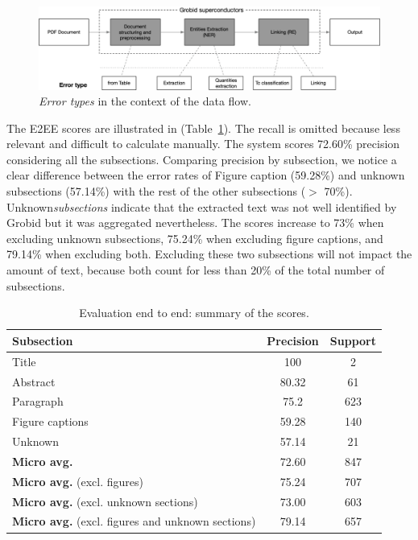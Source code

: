 \documentclass[]{interact}
\theoremstyle{plain}%
\theoremstyle{definition}
\theoremstyle{remark}
\begin{document}
\begin{figure}[ht]
\centering
\includegraphics[width=\textwidth]{error-types-3.png}
\caption{\textit{Error types} in the context of the data flow. }
\label{fig:error-types}
\end{figure}

The E2EE scores are illustrated in (Table~\ref{table:end2end-evaluation-summary}). 
The recall is omitted because less relevant and difficult to calculate manually. 
The system scores 72.60\% precision considering all the subsections. 
Comparing precision by subsection, we notice a clear difference between the error rates of Figure caption (59.28\%) and unknown subsections (57.14\%) with the rest of the other subsections ($>$ 70\%). 
Unknown\textit{subsections} indicate that the extracted text was not well identified by Grobid but it was aggregated nevertheless.
The scores increase to 73\% when excluding unknown subsections, 75.24\% when excluding figure captions, and 79.14\%  when excluding both. 
Excluding these two subsections will not impact the amount of text, because both count for less than 20\% of the total number of subsections. 


\begin{table}[ht]
\centering\small
\begin{tabular}{l c c}
\toprule
\textbf{Subsection} & \textbf{Precision} & \textbf{Support} \\ 
\midrule
Title               & 100       & 2     \\
Abstract            & 80.32     & 61    \\
Paragraph           & 75.2      & 623   \\    
Figure captions     & 59.28     & 140   \\    
Unknown             & 57.14     & 21    \\
\midrule
\textbf{Micro avg.}  & 72.60     & 847   \\
\textbf{Micro avg.} (excl. figures)  & 75.24     & 707   \\ 
\textbf{Micro avg.} (excl. unknown sections)  & 73.00     & 603   \\ 
\textbf{Micro avg.} (excl. figures and unknown sections)  & 79.14     & 657   \\ 
\bottomrule
\end{tabular}
\caption{Evaluation end to end: summary of the scores. }
\label{table:end2end-evaluation-summary}
\end{table}
\end{document}
